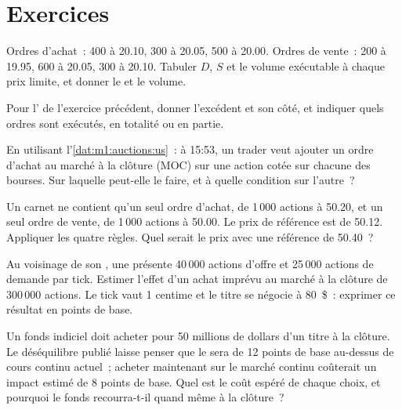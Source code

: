 \section{Exercices}

\begin{exercise}[$\star$]\label{exo:m1:auctions:1}
Ordres d'achat~: 400 à 20.10, 300 à 20.05, 500 à 20.00. Ordres de vente~: 200 à
19.95, 600 à 20.05, 300 à 20.10. Tabuler $D$, $S$ et le volume
exécutable à chaque prix limite, et donner le  et le volume.
\end{exercise}

\begin{exercise}[$\star$]\label{exo:m1:auctions:2}
Pour l' de l'exercice précédent, donner l'excédent et son côté, et
indiquer quels ordres sont exécutés, en totalité ou en partie.
\end{exercise}

\begin{exercise}[$\star$]\label{exo:m1:auctions:3}
En utilisant l'\cref{dat:m1:auctions:us}~: à 15:53, un trader veut ajouter un
ordre d'achat au marché à la clôture (MOC) sur une action cotée sur chacune des bourses. Sur laquelle peut-elle le faire,
et à quelle condition sur l'autre~?
\end{exercise}

\begin{exercise}[$\star\star$]\label{exo:m1:auctions:4}
Un carnet ne contient qu'un seul ordre d'achat, de 1\,000 actions à 50.20, et un seul
ordre de vente, de 1\,000 actions à 50.00. Le prix de référence est de 50.12. Appliquer les quatre
règles. Quel serait le prix avec une référence de 50.40~?
\end{exercise}

\begin{exercise}[$\star\star$]\label{exo:m1:auctions:5}
Au voisinage de son , une  présente 40\,000 actions d'offre et 25\,000
actions de demande par tick. Estimer l'effet d'un achat imprévu
au marché à la clôture de 300\,000 actions. Le tick vaut 1 centime et le titre
se négocie à 80~\$~: exprimer ce résultat en points de base.
\end{exercise}

\begin{exercise}[$\star\star$]\label{exo:m1:auctions:6}
Un fonds indiciel doit acheter pour 50 millions de dollars d'un titre à la clôture. Le
déséquilibre publié laisse penser que le  sera de 12 points de base au-dessus de
cours continu actuel~; acheter maintenant sur le marché continu coûterait un impact estimé
de 8 points de base. Quel est le coût espéré de chaque choix, et pourquoi
le fonds recourra-t-il quand même à la clôture~?
\end{exercise}

